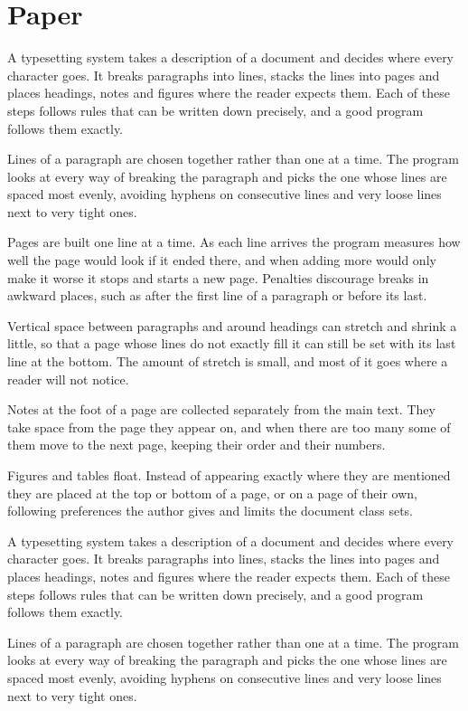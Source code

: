 \documentclass[a4paper]{article}
\begin{document}
\section{Paper}
A typesetting system takes a description of a document and decides where every character goes. It breaks paragraphs into lines, stacks the lines into pages and places headings, notes and figures where the reader expects them. Each of these steps follows rules that can be written down precisely, and a good program follows them exactly.

Lines of a paragraph are chosen together rather than one at a time. The program looks at every way of breaking the paragraph and picks the one whose lines are spaced most evenly, avoiding hyphens on consecutive lines and very loose lines next to very tight ones.

Pages are built one line at a time. As each line arrives the program measures how well the page would look if it ended there, and when adding more would only make it worse it stops and starts a new page. Penalties discourage breaks in awkward places, such as after the first line of a paragraph or before its last.

Vertical space between paragraphs and around headings can stretch and shrink a little, so that a page whose lines do not exactly fill it can still be set with its last line at the bottom. The amount of stretch is small, and most of it goes where a reader will not notice.

Notes at the foot of a page are collected separately from the main text. They take space from the page they appear on, and when there are too many some of them move to the next page, keeping their order and their numbers.

Figures and tables float. Instead of appearing exactly where they are mentioned they are placed at the top or bottom of a page, or on a page of their own, following preferences the author gives and limits the document class sets.

A typesetting system takes a description of a document and decides where every character goes. It breaks paragraphs into lines, stacks the lines into pages and places headings, notes and figures where the reader expects them. Each of these steps follows rules that can be written down precisely, and a good program follows them exactly.

Lines of a paragraph are chosen together rather than one at a time. The program looks at every way of breaking the paragraph and picks the one whose lines are spaced most evenly, avoiding hyphens on consecutive lines and very loose lines next to very tight ones.
\end{document}
